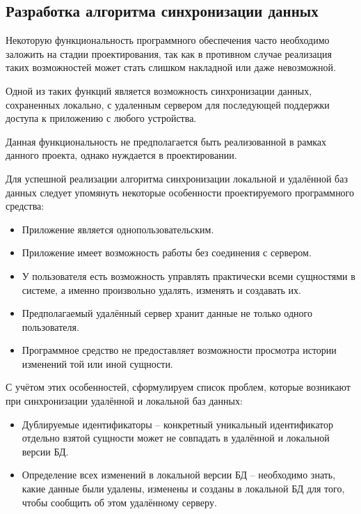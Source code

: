 \subsection{Разработка алгоритма синхронизации данных}
\label{sec:design:sync}

Некоторую функциональность программного обеспечения часто необходимо заложить на стадии проектирования, так как в противном случае реализация таких возможностей может стать слишком накладной или даже невозможной.

Одной из таких функций является возможность синхронизации данных, сохраненных локально, с удаленным сервером для последующей поддержки доступа к приложению с любого устройства.

Данная функциональность не предполагается быть реализованной в рамках данного проекта, однако нуждается в проектировании.

Для успешной реализации алгоритма синхронизации локальной и удалённой баз данных следует упомянуть некоторые особенности проектируемого программного средства:
\begin{itemize}
    \item Приложение является однопользовательским.
    \item Приложение имеет возможность работы без соединения с сервером.
    \item У пользователя есть возможность управлять практически всеми сущностями в системе, а именно произвольно удалять, изменять и создавать их.
    \item Предполагаемый удалённый сервер хранит данные не только одного пользователя.
    \item Программное средство не предоставляет возможности просмотра истории изменений той или иной сущности.
\end{itemize}

С учётом этих особенностей, сформулируем список проблем, которые возникают при синхронизации удалённой и локальной баз данных:
\begin{itemize}
    \item Дублируемые идентификаторы -- конкретный уникальный идентификатор отдельно взятой сущности может не совпадать в удалённой и локальной версии БД.
    \item Определение всех изменений в локальной версии БД -- необходимо знать, какие данные были удалены, изменены и созданы в локальной БД для того, чтобы сообщить об этом удалённому серверу.
\end{itemize}

